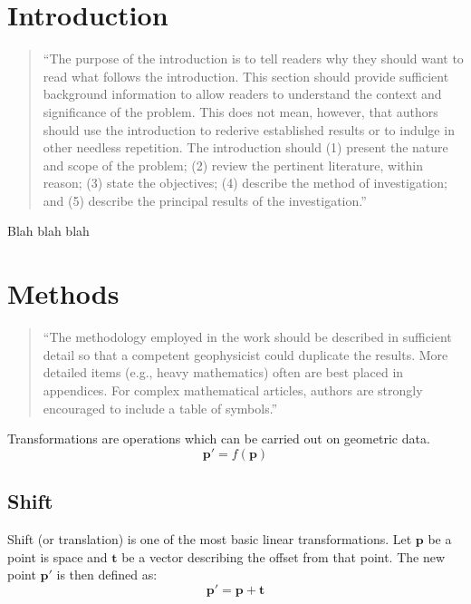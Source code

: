 \documentclass[]{report}   %
\begin{document}
\chapter{Introduction}		%


\begin{quotation}
	``The purpose of the introduction is to tell readers why they should want to read what follows the introduction.
	This section should provide sufficient background information to allow readers to understand the context and
	significance of the problem. This does not mean, however, that authors should use the introduction to rederive
	established results or to indulge in other needless repetition. The introduction should (1) present the nature
	and scope of the problem; (2) review the pertinent literature, within reason; (3) state the objectives; (4)
	describe the method of investigation; and (5) describe the principal results of the investigation.''
\end{quotation}


Blah blah blah





\chapter{Methods}           %

\begin{quotation}
	``The methodology employed in the work should be described in sufficient detail so that a competent geophysicist
	could duplicate the results. More detailed items (e.g., heavy mathematics) often are best placed in appendices.
	For complex mathematical articles, authors are strongly encouraged to include a table of symbols.''
\end{quotation}

Transformations are operations which can be carried out on geometric data. 
\[
	\mathbf{p\prime} = f(\mathbf{p})
\]



\section{Shift}

Shift (or translation) is one of the most basic linear transformations. Let \(\mathbf{p}\) be a point is space and \(\mathbf{t}\) be a vector describing the offset from that point. The new point \(\mathbf{p\prime}\) is then defined as:
\[
	\mathbf{p\prime} = \mathbf{p} + \mathbf{t}
\]
\end{document}
